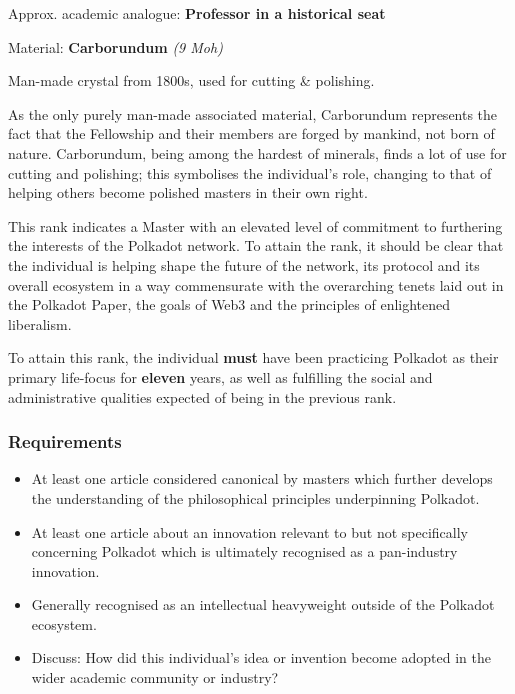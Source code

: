\documentclass[9pt,oneside]{amsart}
\begin{document}

Approx. academic analogue: \textbf{Professor in a historical seat}

Material: \textbf{Carborundum} \emph{(9 Moh)}

Man-made crystal from 1800s, used for cutting \& polishing.

As the only purely man-made associated material, Carborundum represents the fact that the Fellowship and their members are forged by mankind, not born of nature. Carborundum, being among the hardest of minerals, finds a lot of use for cutting and polishing; this symbolises the individual's role, changing to that of helping others become polished masters in their own right.

This rank indicates a Master with an elevated level of commitment to furthering the interests of the Polkadot network. To attain the rank, it should be clear that the individual is helping shape the future of the network, its protocol and its overall ecosystem in a way commensurate with the overarching tenets laid out in the Polkadot Paper, the goals of Web3 and the principles of enlightened liberalism.

To attain this rank, the individual \textbf{must} have been practicing Polkadot as their primary life-focus for \textbf{eleven} years, as well as fulfilling the social and administrative qualities expected of being in the previous rank.

\subsubsection{Requirements}\label{requirements-8}

\begin{itemize}
\item At least one article considered canonical by masters which further develops the understanding of the philosophical principles underpinning Polkadot.
\item At least one article about an innovation relevant to but not specifically concerning Polkadot which is ultimately recognised as a pan-industry innovation.
\item Generally recognised as an intellectual heavyweight outside of the Polkadot ecosystem.
\item Discuss: How did this individual's idea or invention become adopted in the wider academic community or industry?
\end{itemize}
\end{document}
